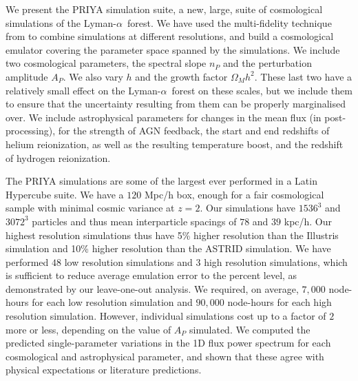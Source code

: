 \documentclass[a4paper,11pt]{article}
\newcommand{\Lya}{Lyman-$\alpha$}
\begin{document}
We present the PRIYA simulation suite, a new, large, suite of cosmological simulations of the \Lya\ forest. We have used the multi-fidelity technique from \cite{Ho:2022, Fernandez:2022} to combine simulations at different resolutions, and build a cosmological emulator covering the parameter space spanned by the simulations. We include two cosmological parameters, the spectral slope $n_P$ and the perturbation amplitude $A_P$. We also vary $h$ and the growth factor $\Omega_M h^2$. These last two have a relatively small effect on the \Lya~forest on these scales, but we include them to ensure that the uncertainty resulting from them can be properly marginalised over. We include astrophysical parameters for changes in the mean flux (in post-processing), for the strength of AGN feedback, the start and end redshifts of helium reionization, as well as the resulting temperature boost, and the redshift of hydrogen reionization.

The PRIYA simulations are some of the largest ever performed in a Latin Hypercube suite. We have a $120$ Mpc/h box, enough for a fair cosmological sample with minimal cosmic variance at $z=2$. Our simulations have $1536^3$ and $3072^3$ particles and thus mean interparticle spacings of $78$ and $39$ kpc/h. Our highest resolution simulations thus have 5\% higher resolution than the Illustris \cite{Vogelsberger:2014} simulation and 10\% higher resolution than the ASTRID \cite{Bird:2022, Ni:2021} simulation. We have performed $48$ low resolution simulations and $3$ high resolution simulations, which is sufficient to reduce average emulation error to the percent level, as demonstrated by our leave-one-out analysis. We required, on average, $7,000$ node-hours for each low resolution simulation and $90,000$ node-hours for each high resolution simulation. However, individual simulations cost up to a factor of $2$ more or less, depending on the value of $A_P$ simulated. We computed the predicted single-parameter variations in the 1D flux power spectrum for each cosmological and astrophysical parameter, and shown that these agree with physical expectations or literature predictions.
\end{document}

